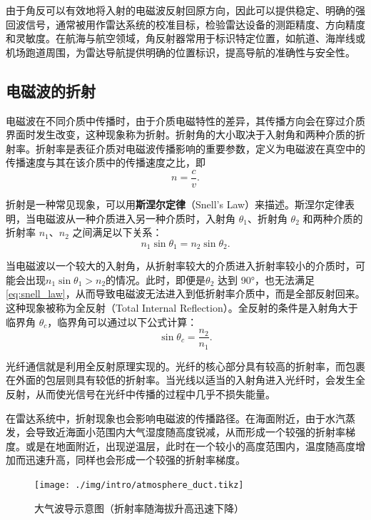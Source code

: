 由于角反可以有效地将入射的电磁波反射回原方向，因此可以提供稳定、明确的强回波信号，通常被用作雷达系统的校准目标，检验雷达设备的测距精度、方向精度和灵敏度。在航海与航空领域，角反射器常用于标识特定位置，如航道、海岸线或机场跑道周围，为雷达导航提供明确的位置标识，提高导航的准确性与安全性。

\subsection{电磁波的折射}

电磁波在不同介质中传播时，由于介质电磁特性的差异，其传播方向会在穿过介质界面时发生改变，这种现象称为折射。折射角的大小取决于入射角和两种介质的折射率。折射率是表征介质对电磁波传播影响的重要参数，定义为电磁波在真空中的传播速度与其在该介质中的传播速度之比，即
\begin{equation}
    n = \frac{c}{v}.
    \label{eq:refraction_index}
\end{equation}

折射是一种常见现象，可以用\textbf{斯涅尔定律}（Snell's Law）来描述。斯涅尔定律表明，当电磁波从一种介质进入另一种介质时，入射角 $\theta_1$、折射角 $\theta_2$ 和两种介质的折射率 $n_1$、$n_2$ 之间满足以下关系：
\begin{equation}
    n_1 \sin \theta_1 = n_2 \sin \theta_2.
    \label{eq:snell_law}
\end{equation}

当电磁波以一个较大的入射角，从折射率较大的介质进入折射率较小的介质时，可能会出现\( n_1 \sin \theta_1 > n_2 \)的情况。此时，即便是\( \theta_2 \) 达到 90°，也无法满足\cref{eq:snell_law}，从而导致电磁波无法进入到低折射率介质中，而是全部反射回来。这种现象被称为全反射（Total Internal Reflection）。全反射的条件是入射角大于临界角 $\theta_c$，临界角可以通过以下公式计算：
\begin{equation}
    \sin \theta_c = \frac{n_2}{n_1}.
    \label{eq:critical_angle}
\end{equation}

光纤通信就是利用全反射原理实现的。光纤的核心部分具有较高的折射率，而包裹在外面的包层则具有较低的折射率。当光线以适当的入射角进入光纤时，会发生全反射，从而使光信号在光纤中传播的过程中几乎不损失能量。

在雷达系统中，折射现象也会影响电磁波的传播路径。在海面附近，由于水汽蒸发，会导致近海面小范围内大气湿度随高度锐减，从而形成一个较强的折射率梯度。或是在地面附近，出现逆温层，此时在一个较小的高度范围内，温度随高度增加而迅速升高，同样也会形成一个较强的折射率梯度。

\begin{figure}[htb!]
    \centering
    \texttt{[image: ./img/intro/atmosphere\_duct.tikz]}
    \caption{大气波导示意图（折射率随海拔升高迅速下降）}
    \label{fig_chp1_atmosphere_duct}
\end{figure}

